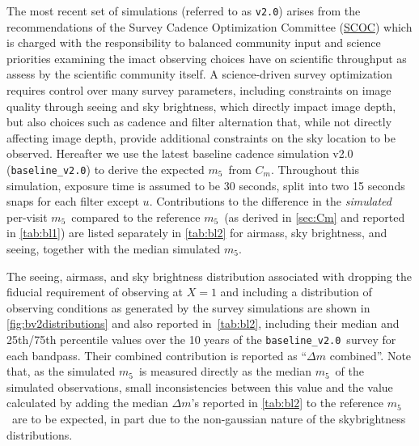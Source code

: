\documentclass[PST,authoryear,toc]{lsstdoc}
\newcommand{\cm}{\ensuremath{C_m}}
\newcommand{\mf}{\ensuremath{m_5}}
\newcommand{\baseline}{\texttt{baseline\_v2.0}}
\begin{document}
 The most recent set of simulations (referred to as \texttt{v2.0}) arises from the recommendations of the Survey Cadence Optimization Committee (\href{https://www.lsst.org/content/charge-survey-cadence-optimization-committee-scoc}{{SCOC}}) {which is charged with the responsibility to balanced community input and science priorities examining the imact observing choices have on scientific throughput as assess by the scientific community itself. A science-driven survey optimization requires control over many survey parameters, including constraints on image quality through seeing and sky brightness, which directly impact image depth, but also choices such as cadence and filter alternation that, while not directly affecting image depth, provide additional constraints on the sky location to be observed}. Hereafter we use the latest baseline cadence simulation v2.0 
(\baseline) to derive the expected \mf\ from \cm. Throughout this simulation, %
exposure time is assumed to be 30 seconds, split into two 15 seconds snaps for each filter except $u$. Contributions to the difference in the {\it simulated} per-visit \mf\ compared to the reference \mf\ (as derived in \autoref{sec:Cm} and reported in \autoref{tab:bl1}) are listed separately in \autoref{tab:bl2} for airmass, sky brightness, and seeing, together with the median simulated \mf.
 
 The seeing, airmass, and sky brightness distribution associated with dropping the fiducial requirement of observing at $X=1$ and including a distribution of observing conditions as generated by the survey simulations are shown in \autoref{fig:bv2distributions} and also reported in~\autoref{tab:bl2}, including their median and 25th/75th percentile values over the 10 years of the \baseline\ survey for each bandpass. Their combined contribution is reported as ``$\Delta m$ combined''. Note that, as the simulated \mf\ is measured directly as the median \mf\ of the simulated observations, small inconsistencies between this value and the value calculated by adding the median $\Delta m$'s reported in \autoref{tab:bl2} to the reference \mf\ are to be expected, in part due to the non-gaussian nature of the skybrightness distributions.
 
\end{document}
